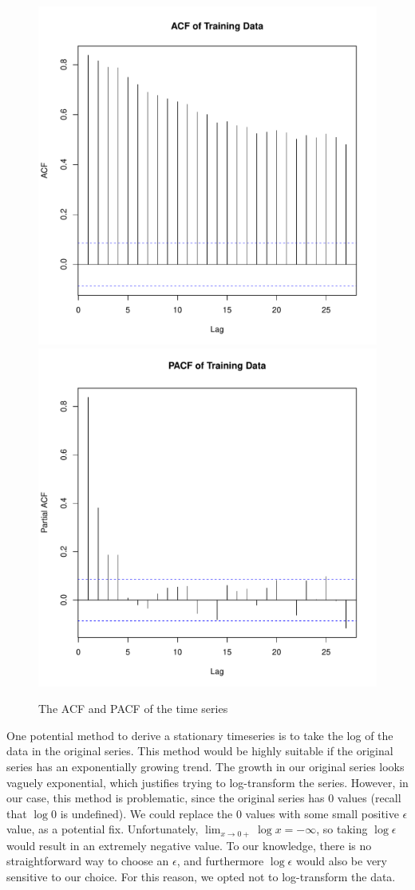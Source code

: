 \documentclass[11pt]{paper}
\begin{document}
\begin{figure}
\centering
\includegraphics[width=0.45\linewidth]{../image/acf_og.pdf}
\includegraphics[width=0.45\linewidth]{../image/pacf_og.pdf}
\caption{The ACF and PACF of the time series}
\label{og_acf_pacf}
\end{figure}



One potential method to derive a stationary timeseries is to take the log of the data in the original series. This method would be highly suitable if the original series has an exponentially growing trend. The growth in our original series looks vaguely exponential, which justifies trying to log-transform the series. However, in our case, this method is problematic, since the original series has 0 values (recall that $\log 0$ is undefined). We could replace the 0 values with some small positive $\epsilon$ value, as a potential fix. Unfortunately, $\lim_{x \rightarrow 0+} \log x = - \infty$, so taking $\log \epsilon$ would result in an extremely negative value. To our knowledge, there is no straightforward way to choose an $\epsilon$, and furthermore $\log{\epsilon}$ would also be very sensitive to our choice. For this reason, we opted not to log-transform the data.
\end{document}
